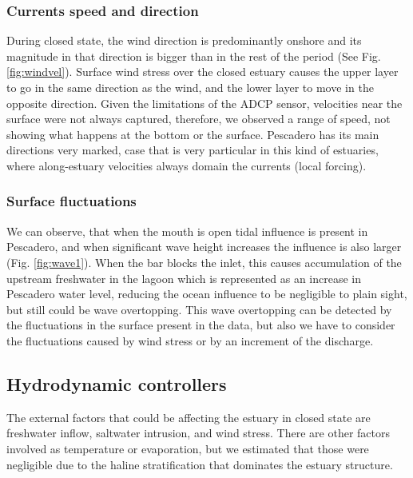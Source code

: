 \documentclass[tesis.tex]{subfiles}
\begin{document}
\subsubsection{Currents speed and direction}

During closed state, the wind direction is predominantly onshore and its magnitude in that direction is bigger than in the rest of the period (See Fig. \ref{fig:windvel}). Surface wind stress over the closed estuary causes the upper layer to go in the same direction as the wind, and the lower layer to move in the opposite direction. Given the limitations of the ADCP sensor, velocities near the surface were not always captured, therefore, we observed a range of speed, not showing what happens at the bottom or the surface. Pescadero has its main directions very marked, case that is very particular in this kind of estuaries, where along-estuary velocities always domain the currents (local forcing). \\

\subsubsection{Surface fluctuations}

We can observe, that when the mouth is open tidal influence is present in Pescadero, and when significant wave height increases the influence is also larger (Fig. \ref{fig:wave1}). When the bar blocks the inlet, this causes accumulation of the upstream freshwater in the lagoon which is represented as an increase in Pescadero water level, reducing the ocean influence to be negligible to plain sight, but still could be wave overtopping. This wave overtopping can be detected by the fluctuations in the surface present in the data, but also we have to consider the fluctuations caused by wind stress or by an increment of the discharge.\\

\subsection{Hydrodynamic controllers}

The external factors that could be affecting the estuary in closed state are freshwater inflow, saltwater intrusion, and wind stress. There are other factors involved as temperature or evaporation, but we estimated that those were negligible due to the haline stratification that dominates the estuary structure.\\
\end{document}
